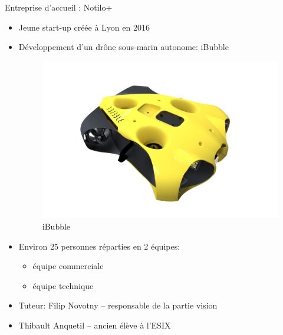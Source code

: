 \documentclass{bredelebeamer}
\begin{document}
\begin{frame}{Entreprise d'accueil : Notilo+}

\begin{itemize}
\item Jeune start-up créée à Lyon en 2016
\item Développement d'un dr\^one sous-marin autonome: iBubble
\begin{figure}
\centering
\includegraphics[scale=0.05]{images/iBubble3.png}
\caption{iBubble}
\end{figure}
\item Environ 25 personnes réparties en 2 équipes:
	\begin{itemize}
	\item équipe commerciale
	\item équipe technique
	\end{itemize}
\item Tuteur: Filip Novotny -- responsable de la partie vision
\item Thibault Anquetil -- ancien élève à l'ESIX
\end{itemize}

\end{frame}

\end{document}
